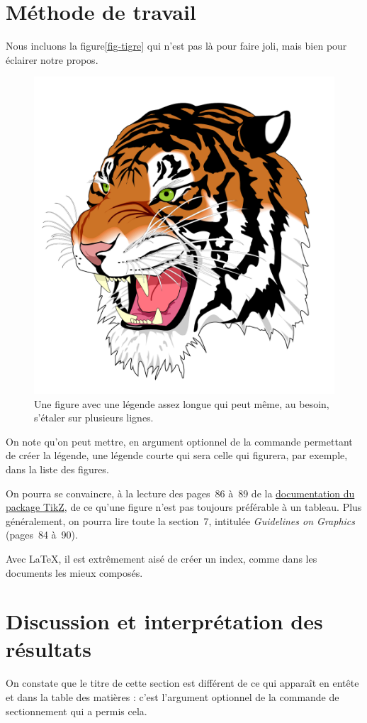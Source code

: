 \documentclass[12pt,space=onehalf,version=final]{yathesis}
\newcommand\package[1]{\textsf{#1}}
\begin{document}
\lipsum[3-22]
%
\section{Méthode de travail}
\label{sec-methode}
%
Nous incluons la figure\vref{fig-tigre} qui n'est
pas là pour faire joli, mais bien pour éclairer notre propos.
\begin{figure}
  \centering
  \capstart
  \includegraphics[width=.35\linewidth]{tiger}
  \caption[Un tigre]{Une figure avec une légende assez longue qui peut
    même, au besoin, s'étaler sur plusieurs lignes.}
  \label{fig-tigre}
\end{figure}
On note qu'on peut mettre, en argument optionnel de la commande
permettant de créer la légende, une légende \og courte\fg{} qui sera
celle qui figurera, par exemple, dans la liste des figures.

On pourra se convaincre, à la lecture des pages~86 à~89 de la
\href{http://mirrors.ctan.org/graphics/pgf/base/doc/generic/pgf/pgfmanual.pdf}{documentation
  du package \package{TikZ}}, de ce qu'une figure
n'est pas toujours préférable à un tableau. Plus
généralement, on pourra lire toute la section~7, intitulée \emph{Guidelines on
  Graphics} (pages~84 à~90).

Avec \LaTeX{}, il est extrêmement aisé de créer
un index, comme dans les documents les mieux
composés.

\lipsum[23-42]
%
\section[Discussion]{Discussion et interprétation des résultats}
\label{sec-discussion}
%
On constate que le titre de cette section est différent de ce qui
apparaît en entête et dans la table des matières : c'est l'argument
optionnel de la commande de sectionnement qui a permis cela.

\lipsum[43-52]
\end{document}
